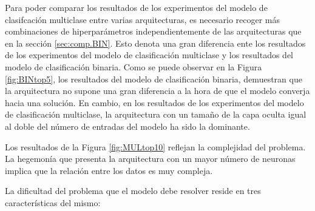 Para poder comparar los resultados de los experimentos del modelo de clasifcación multiclase entre varias arquitecturas, es necesario recoger más combinaciones de hiperparámetros independientemente de las arquitecturas que en la sección \ref{sec:comp.BIN}. Esto denota una gran diferencia ente los resultados de los experimentos del modelo de clasificación multiclase y los resultados del modelo de clasificación binaria. Como se puede observar en la Figura \ref{fig:BINtop5}, los resultados del modelo de clasificación binaria, demuestran que la arquitectura no supone una gran diferencia a la hora de que el modelo converja hacia una solución. En cambio, en los resultados de los experimentos del modelo de clasificación multiclase, la arquitectura con un tamaño de la capa oculta igual al doble del número de entradas del modelo ha sido la dominante.

Los resultados de la Figura \ref{fig:MULtop10} reflejan la complejidad del problema. La hegemonía que presenta la arquitectura con un mayor número de neuronas implica que la relación entre los datos es muy compleja. 

La dificultad del problema que el modelo debe resolver reside en tres características del mismo:

